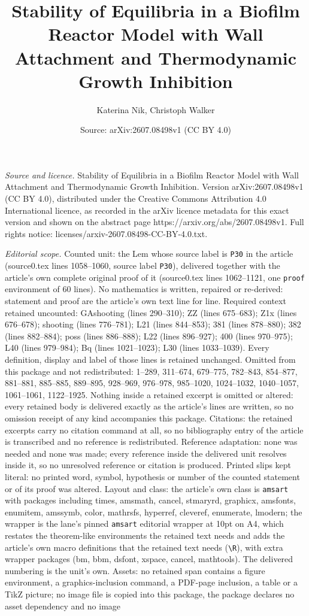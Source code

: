 \documentclass[10pt,a4paper]{amsart}
\title[Stability of Equilibria in a Biofilm Reactor Model with Wall]{Stability of Equilibria in a Biofilm Reactor Model with Wall Attachment and Thermodynamic Growth Inhibition}
\author{Katerina Nik, Christoph Walker}
\date{Source: arXiv:2607.08498v1 (CC BY 4.0)}
\begin{document}
\maketitle

\noindent\emph{Source and licence.} Stability of Equilibria in a Biofilm Reactor Model with Wall Attachment and Thermodynamic Growth Inhibition. Version arXiv:2607.08498v1 (CC BY 4.0), distributed under the Creative Commons Attribution 4.0 International licence, as recorded in the arXiv licence metadata for this exact version and shown on the abstract page https://arxiv.org/abs/2607.08498v1. Full rights notice: licenses/arxiv-2607.08498-CC-BY-4.0.txt.\par\smallskip

\noindent\textit{Editorial scope.} Counted unit: the Lem whose source label is \texttt{P30} in the article (source0.tex lines 1058--1060, source label \texttt{P30}), delivered together with the article's own complete original proof of it (source0.tex lines 1062--1121, one \texttt{proof} environment of 60 lines). No mathematics is written, repaired or re-derived: statement and proof are the article's own text line for line. Required context retained uncounted: GAshooting (lines 290--310); ZZ (lines 675--683); Z1x (lines 676--678); shooting (lines 776--781); L21 (lines 844--853); 381 (lines 878--880); 382 (lines 882--884); poss (lines 886--888); L22 (lines 896--927); 400 (lines 970--975); L40 (lines 979--984); Bq (lines 1021--1023); L30 (lines 1033--1039). Every definition, display and label of those lines is retained unchanged. Omitted from this package and not redistributed: 1--289, 311--674, 679--775, 782--843, 854--877, 881--881, 885--885, 889--895, 928--969, 976--978, 985--1020, 1024--1032, 1040--1057, 1061--1061, 1122--1925. Nothing inside a retained excerpt is omitted or altered: every retained body is delivered exactly as the article's lines are written, so no omission receipt of any kind accompanies this package. Citations: the retained excerpts carry no citation command at all, so no bibliography entry of the article is transcribed and no reference is redistributed. Reference adaptation: none was needed and none was made; every reference inside the delivered unit resolves inside it, so no unresolved reference or citation is produced. Printed slips kept literal: no printed word, symbol, hypothesis or number of the counted statement or of its proof was altered. Layout and class: the article's own class is \texttt{amsart} with packages including times, amsmath, cancel, stmaryrd, graphicx, amsfonts, enumitem, amssymb, color, mathrsfs, hyperref, cleveref, enumerate, lmodern; the wrapper is the lane's pinned \texttt{amsart} editorial wrapper at 10pt on A4, which restates the theorem-like environments the retained text needs and adds the article's own macro definitions that the retained text needs (\texttt{\textbackslash R}), with extra wrapper packages (bm, bbm, dsfont, xspace, cancel, mathtools). The delivered numbering is the unit's own. Assets: no retained span contains a figure environment, a graphics-inclusion command, a PDF-page inclusion, a table or a TikZ picture; no image file is copied into this package, the package declares no asset dependency and no image 
\end{document}
